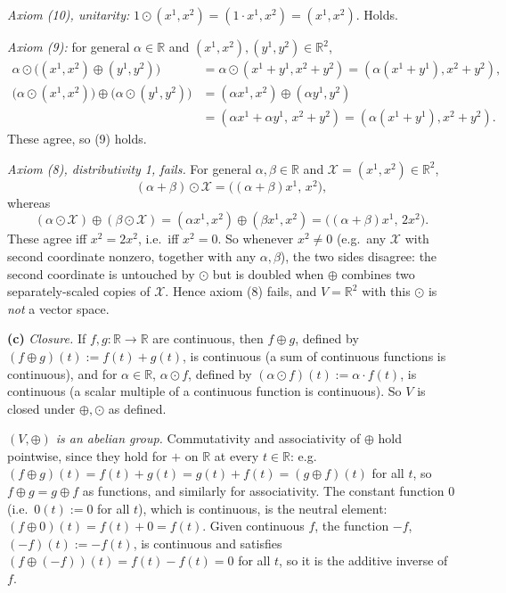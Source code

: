 \documentclass[11pt]{article}
\begin{document}
\emph{Axiom (10), unitarity:} $1\odot(x^1,x^2) = (1\cdot x^1,x^2) = (x^1,x^2)$. Holds.

\emph{Axiom (9):} for general $\alpha\in\mathbb R$ and $(x^1,x^2),(y^1,y^2)\in\mathbb R^2$,
\begin{align*}
\alpha\odot\big((x^1,x^2)\oplus(y^1,y^2)\big) &= \alpha\odot(x^1+y^1,x^2+y^2) = (\alpha(x^1+y^1),x^2+y^2), \\
\big(\alpha\odot(x^1,x^2)\big)\oplus\big(\alpha\odot(y^1,y^2)\big) &= (\alpha x^1,x^2)\oplus(\alpha y^1,y^2) \\
&= (\alpha x^1+\alpha y^1,\,x^2+y^2) = (\alpha(x^1+y^1),x^2+y^2).
\end{align*}
These agree, so (9) holds.

\emph{Axiom (8), distributivity 1, fails.} For general $\alpha,\beta\in\mathbb R$ and $\mathcal X=(x^1,x^2)\in\mathbb R^2$,
\[
(\alpha+\beta)\odot\mathcal X = \big((\alpha+\beta)x^1,\,x^2\big),
\]
whereas
\[
(\alpha\odot\mathcal X)\oplus(\beta\odot\mathcal X) = (\alpha x^1,x^2)\oplus(\beta x^1,x^2) = \big((\alpha+\beta)x^1,\,2x^2\big).
\]
These agree iff $x^2=2x^2$, i.e.\ iff $x^2=0$. So whenever $x^2\neq 0$ (e.g.\ any $\mathcal X$ with second coordinate nonzero, together with any $\alpha,\beta$), the two sides disagree: the second coordinate is untouched by $\odot$ but is doubled when $\oplus$ combines two separately-scaled copies of $\mathcal X$. Hence axiom (8) fails, and $V=\mathbb R^2$ with this $\odot$ is \emph{not} a vector space.

\textbf{(c)} \emph{Closure.} If $f,g:\mathbb R\to\mathbb R$ are continuous, then $f\oplus g$, defined by $(f\oplus g)(t):=f(t)+g(t)$, is continuous (a sum of continuous functions is continuous), and for $\alpha\in\mathbb R$, $\alpha\odot f$, defined by $(\alpha\odot f)(t):=\alpha\cdot f(t)$, is continuous (a scalar multiple of a continuous function is continuous). So $V$ is closed under $\oplus,\odot$ as defined.

\emph{$(V,\oplus)$ is an abelian group.} Commutativity and associativity of $\oplus$ hold pointwise, since they hold for $+$ on $\mathbb R$ at every $t\in\mathbb R$: e.g.\ $(f\oplus g)(t)=f(t)+g(t)=g(t)+f(t)=(g\oplus f)(t)$ for all $t$, so $f\oplus g = g\oplus f$ as functions, and similarly for associativity. The constant function $0$ (i.e.\ $0(t):=0$ for all $t$), which is continuous, is the neutral element: $(f\oplus 0)(t)=f(t)+0=f(t)$. Given continuous $f$, the function $-f$, $(-f)(t):=-f(t)$, is continuous and satisfies $(f\oplus(-f))(t) = f(t)-f(t)=0$ for all $t$, so it is the additive inverse of $f$.
\end{document}
